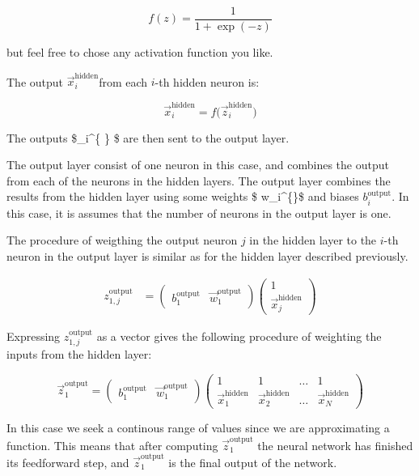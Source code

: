 \documentclass[11pt]{article}
\begin{document}
\[
f(z) = \frac{1}{1 + \exp{(-z)}}
\]

but feel free to chose any activation function you like.

The output \(\vec{x}_i^{\text{hidden} }\)from each \(i\)-th hidden
neuron is:

\[
\vec{x}_i^{\text{hidden} } = f\big(  \vec{z}_{i}^{\text{hidden}} \big)
\]

The outputs \$\_i\^{}\{ \} \$ are then sent to the
output layer.

The output layer consist of one neuron in this case, and combines the
output from each of the neurons in the hidden layers. The output layer
combines the results from the hidden layer using some weights \$
w\_i\^{}\{\}\$ and biases \(b_i^{\text{output}}\). In this
case, it is assumes that the number of neurons in the output layer is
one.

The procedure of weigthing the output neuron \(j\) in the hidden layer
to the \(i\)-th neuron in the output layer is similar as for the hidden
layer described previously.

\[
\begin{aligned}
z_{1,j}^{\text{output}} & = 
\begin{pmatrix}
b_1^{\text{output}} & \vec{w}_1^{\text{output}}
\end{pmatrix}
\begin{pmatrix}
1 \\
\vec{x}_j^{\text{hidden}}
\end{pmatrix}
\end{aligned}
\]

Expressing \(z_{1,j}^{\text{output}}\) as a vector gives the following
procedure of weighting the inputs from the hidden layer:

\[
\vec{z}_{1}^{\text{output}} = 
\begin{pmatrix}
b_1^{\text{output}} & \vec{w}_1^{\text{output}}
\end{pmatrix}
\begin{pmatrix}
1  & 1 & \dots & 1 \\
\vec{x}_1^{\text{hidden}} & \vec{x}_2^{\text{hidden}} & \dots & \vec{x}_N^{\text{hidden}}
\end{pmatrix}
\]

In this case we seek a continous range of values since we are
approximating a function. This means that after computing
\(\vec{z}_{1}^{\text{output}}\) the neural network has finished its
feedforward step, and \(\vec{z}_{1}^{\text{output}}\) is the final
output of the network.
\end{document}
